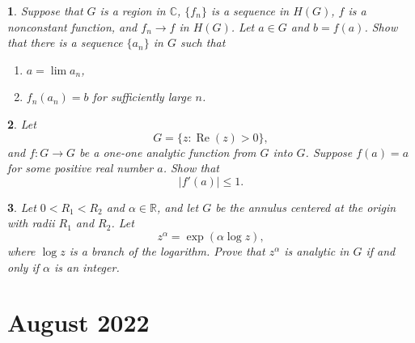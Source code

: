 \documentclass[12pt, a4paper]{report}
\theoremstyle{spaced}
\newtheorem{exercise}{}
\begin{document}
\begin{exercise}
	Suppose that \(G\) is a region in \(\mathbb{C}\), \(\{f_n\}\) is a sequence in
	\(H(G)\), \(f\) is a nonconstant function, and \(f_n\to f\) in \(H(G)\). Let
	\(a\in G\) and \(b=f(a)\). Show that there is a sequence \(\{a_n\}\) in \(G\)
	such that
	\begin{enumerate}
		\item[(i)] \(a=\lim a_n\),
		\item[(ii)] \(f_n(a_n)=b\) for sufficiently large \(n\).
	\end{enumerate}
\end{exercise}

\begin{exercise}
	Let
	\[
		G=\{z:\operatorname{Re}(z)>0\},
	\]
	and \(f:G\to G\) be a one-one analytic function from \(G\) into \(G\). Suppose
	\(f(a)=a\) for some positive real number \(a\). Show that
	\[
		|f'(a)|\le 1.
	\]
\end{exercise}

\begin{exercise}
	Let \(0<R_1<R_2\) and \(\alpha\in\mathbb{R}\), and let \(G\) be the annulus
	centered at the origin with radii \(R_1\) and \(R_2\). Let
	\[
		z^\alpha=\exp(\alpha\log z),
	\]
	where \(\log z\) is a branch of the logarithm. Prove that \(z^\alpha\) is
	analytic in \(G\) if and only if \(\alpha\) is an integer.
\end{exercise}
\chapter{August 2022}
\end{document}
